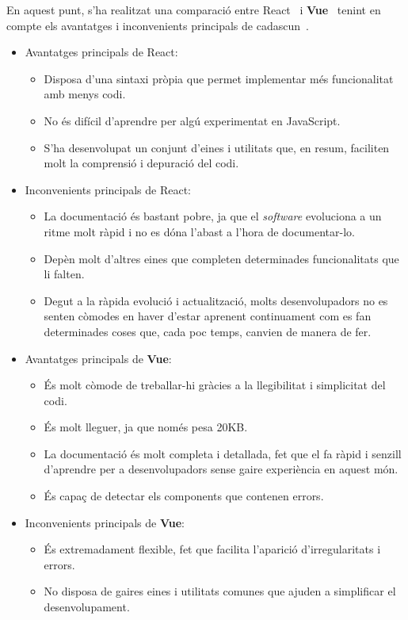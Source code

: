 \documentclass[a4paper,12pt]{ThesisStyle}
\begin{document}
En aquest punt, s'ha realitzat una comparació entre React~\cite{React} i \textbf{Vue}~\cite{Vue} tenint en compte els avantatges i inconvenients principals de cadascun~\cite{ReactVsVue}.
\begin{itemize}
  \item Avantatges principals de React:
  \begin{itemize}
    \item Disposa d'una sintaxi pròpia que permet implementar més funcionalitat amb menys codi.
    \item No és difícil d'aprendre per algú experimentat en JavaScript.
    \item S'ha desenvolupat un conjunt d'eines i utilitats que, en resum, faciliten molt la comprensió i depuració del codi.
  \end{itemize}
  \item Inconvenients principals de React:
  \begin{itemize}
    \item La documentació és bastant pobre, ja que el \textit{software} evoluciona a un ritme molt ràpid i no es dóna l'abast a l'hora de documentar-lo.
    \item Depèn molt d'altres eines que completen determinades funcionalitats que li falten.
    \item Degut a la ràpida evolució i actualització, molts desenvolupadors no es senten còmodes en haver d'estar aprenent continuament com es fan determinades coses que, cada poc temps, canvien de manera de fer.
  \end{itemize}
  \item Avantatges principals de \textbf{Vue}:
  \begin{itemize}
    \item És molt còmode de treballar-hi gràcies a la llegibilitat i simplicitat del codi.
    \item És molt lleguer, ja que només pesa 20KB.
    \item La documentació és molt completa i detallada, fet que el fa ràpid i senzill d'aprendre per a desenvolupadors sense gaire experiència en aquest món.
    \item És capaç de detectar els components que contenen errors.
  \end{itemize}
  \item Inconvenients principals de \textbf{Vue}:
  \begin{itemize}
    \item És extremadament flexible, fet que facilita l'aparició d'irregularitats i errors.
    \item No disposa de gaires eines i utilitats comunes que ajuden a simplificar el desenvolupament.
  \end{itemize}
\end{itemize}
\end{document}
